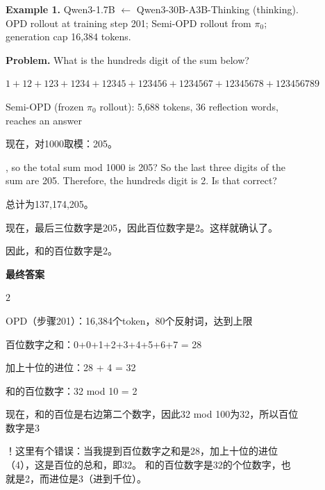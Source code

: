 \begin{figure}[h]
\centering
\begin{qualproblem}
\textbf{Example 1.} Qwen3-1.7B $\leftarrow$ Qwen3-30B-A3B-Thinking (thinking). OPD rollout at training step 201; Semi-OPD rollout from $\pi_0$; generation cap 16{,}384 tokens.\par\smallskip
\textbf{Problem.} What is the hundreds digit of the sum below?

$1 + 12 + 123 + 1234 + 12345 + 123456 + 1234567 + 12345678 + 123456789$
\end{qualproblem}
\vspace{-1pt}
\begin{minipage}[t]{0.495\linewidth}\vspace{0pt}
\begin{Semi-OPDbox}{Semi-OPD (frozen $\pi_0$ rollout): 5{,}688 tokens, 36 reflection words, reaches an answer}

现在，对1000取模：205。

, so the total sum mod 1000 is 205? So the last three digits of the sum are 205. Therefore, the hundreds digit is 2. Is that correct?


总计为137,174,205。

现在，最后三位数字是205，因此百位数字是2。这样就确认了。


因此，和的百位数字是2。

\textbf{最终答案} \newline\rule{0pt}{2.6ex}$\boxed{2}$

\end{Semi-OPDbox}
\end{minipage}\hfill
\begin{minipage}[t]{0.495\linewidth}\vspace{0pt}
\begin{opdbox}{OPD（步骤201）：16,384个token，80个反射词，达到上限}

百位数字之和：0+0+1+2+3+4+5+6+7 = 28

加上十位的进位：28 + 4 = 32

和的百位数字：32 mod 10 = 2


现在，和的百位是右边第二个数字，因此32 mod 100为32，所以百位数字是3


！这里有个错误：当我提到百位数字之和是28，加上十位的进位（4），这是百位的总和，即32。  和的百位数字是32的个位数字，也就是2，而进位是3（进到千位）。


\end{opdbox}
\end{minipage}
\end{figure}

